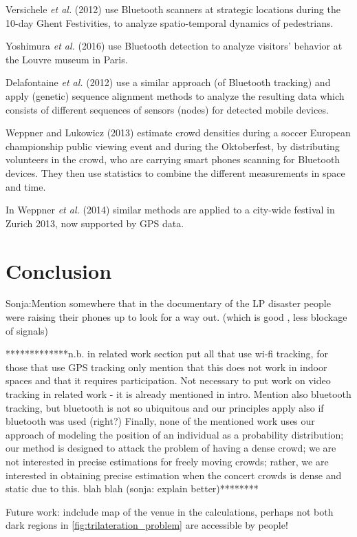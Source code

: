 \documentclass[10pt,a4paper]{article}
\begin{document}
Versichele \textit{et al.} (2012) \cite{versichele:1} use Bluetooth scanners at strategic locations during the 10-day Ghent Festivities, to analyze spatio-temporal dynamics of pedestrians. 

Yoshimura \textit{et al.} (2016) \cite{yoshimura:1} use Bluetooth detection to analyze visitors' behavior at the Louvre museum in Paris.

Delafontaine \textit{et al.} (2012) \cite{delafontaine:1} use a similar approach (of Bluetooth tracking) and apply (genetic) sequence alignment methods to analyze the resulting data which consists of different sequences of sensors (nodes) for detected mobile devices.

Weppner and Lukowicz (2013) \cite{weppner:1} estimate crowd densities during a soccer European championship public viewing event and during the Oktoberfest, by distributing volunteers in the crowd, who are carrying smart phones scanning for Bluetooth devices. They then use statistics to combine the different measurements in space and time.

In Weppner \textit{et al.} (2014) \cite{weppner:2} similar methods are applied to a city-wide festival in Zurich 2013, now supported by GPS data.



\section{Conclusion}

Sonja:Mention somewhere that in the documentary of the LP disaster people were raising their phones up to look for a way out. (which is good , less blockage of signals)


*************n.b. in related work section put all that use wi-fi tracking, for those that use GPS tracking only mention that this does not work in indoor spaces and that it requires participation. Not necessary to put work on video tracking in related work - it is already mentioned in intro. Mention also bluetooth tracking, but bluetooth is not so ubiquitous and our principles apply also if bluetooth was used (right?) 
Finally, none of the mentioned work uses our approach of modeling the position of an individual as a probability distribution; our method is designed to attack the problem of having a dense crowd; we are not interested in precise estimations for freely moving crowds; rather, we are interested in obtaining precise estimation when the  concert crowds is dense and static due to this. blah blah (sonja: explain better)********

Future work: indclude map of the venue in the calculations, perhaps not both dark  regions in \ref{fig:trilateration_problem} are accessible by people!



\end{document}
